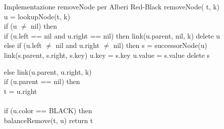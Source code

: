 \begin{minicode}{Implementazione removeNode per Alberi Red-Black}
\ind{} removeNode( t,  k)\\
     u = lookupNode(t, k)\\
    \indf if (u $\neq$ nil) then\\
        \indff if (u.left == nil and u.right == nil) then\hfill{}
            link(u.parent, nil, k)\hfill{}
            delete u\\
        \indff else if (u.left $\neq$ nil and u.right $\neq$ nil) then\hfill{}
             s = successorNode(u)\\
            link(s.parent, s.right, s.key)\hfill{}
            u.key = s.key\hfill{}
            u.value = s.value\hfill{}
            delete s
\end{minicode}
\begin{codecont}
\begin{minipage}[t]{\textwidth}
        \indff else\hfill{}
            link(u.parent, u.right, k)\\
            \indfff if (u.parent == nil) then\\
                t = u.right\\
        \\\indff if (u.color == BLACK) then\\
            balanceRemove(t, u)\hfill{}
    \indf return t
\end{minipage}
\end{codecont}

